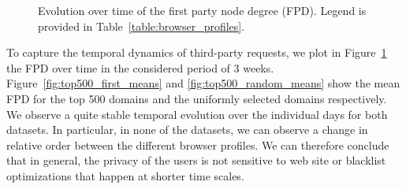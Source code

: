 \documentclass[compsoc, conference, letterpaper, 10pt, times]{IEEEtran}
\begin{document}
\begin{figure}

  \caption{Evolution over time of the first party node degree (FPD). Legend is provided in Table~\ref{table:browser_profiles}.}
  \label{fig:FPD_over_time}
  
\end{figure}


To capture the temporal dynamics of third-party requests, we plot in Figure~\ref{fig:FPD_over_time} the FPD over time in the considered period of 3 weeks. Figure~\ref{fig:top500_first_means} and \ref{fig:top500_random_means} show the mean FPD for the top 500 domains and the uniformly selected domains respectively. We observe a quite stable temporal evolution over the individual days for both datasets. In particular, in none of the datasets, we can observe a change in relative order between the different browser profiles. We can therefore conclude that in general, the privacy of the users is not sensitive to web site or blacklist optimizations that happen at shorter time scales. 
\end{document}
